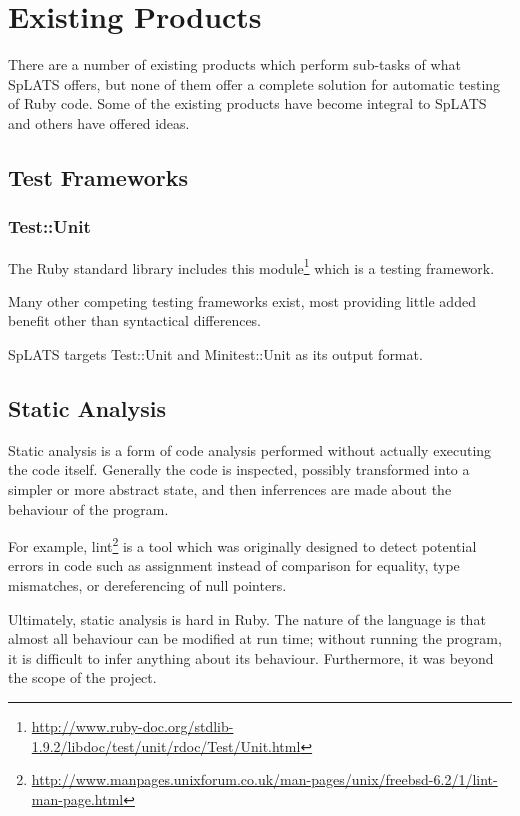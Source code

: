 \chapter{Existing Products}

There are a number of existing products which perform sub-tasks of what SpLATS offers, but none of them offer a complete solution for automatic testing of Ruby code. Some of the existing products have become integral to SpLATS and others have offered ideas.

\section{Test Frameworks}

  \subsection{Test::Unit}
    The Ruby standard library includes this
module\footnote{\url{http://www.ruby-doc.org/stdlib-1.9.2/libdoc/test/unit/rdoc/Test/Unit.html}}
which is a testing framework.

Many other competing testing frameworks exist, most providing little added
benefit other than syntactical differences.

SpLATS targets Test::Unit and Minitest::Unit as its output format.

\section{Static Analysis}

  Static analysis is a form of code analysis performed without actually
  executing the code itself. Generally the code is inspected, possibly
  transformed into a simpler or more abstract state, and then inferrences
  are made about the behaviour of the program.

  For example, lint\footnote{\url{http://www.manpages.unixforum.co.uk/man-pages/unix/freebsd-6.2/1/lint-man-page.html}}
  is a tool which was originally designed to detect potential errors in
  code such as assignment instead of comparison for equality, type mismatches,
  or dereferencing of null pointers.

  Ultimately, static analysis is hard in Ruby. The nature of the language is that
  almost all behaviour can be modified at run time; without running the program,
  it is difficult to infer anything about its behaviour. Furthermore, it was beyond
  the scope of the project.

